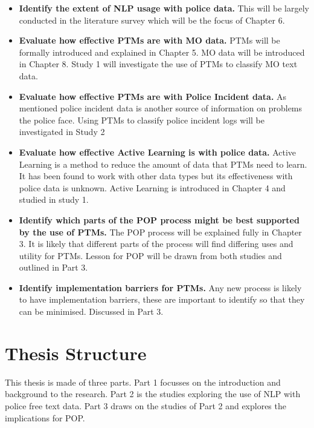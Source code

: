 \begin{itemize}
\item {\bf Identify the extent of NLP usage with police data.} This will be largely conducted in the literature survey which will be the focus of Chapter 6.

\item {\bf Evaluate how effective PTMs are with MO data.} PTMs will be formally introduced and explained in Chapter 5. MO data will be introduced in Chapter 8. Study 1 will investigate the use of PTMs to classify MO text data.

\item {\bf Evaluate how effective PTMs are with Police Incident data.} As mentioned police incident data is another source of information on problems the police face. Using PTMs to classify police incident logs will be investigated in Study 2 

\item {\bf Evaluate how effective Active Learning is with police data.}  Active Learning is a method to reduce the amount of data that PTMs need to learn. It has been found to work with other data types but its effectiveness with police data is unknown. Active Learning is introduced in Chapter 4 and studied in study 1.

\item {\bf Identify which parts of the POP process might be best supported by the use of PTMs.} The POP process will be explained fully in Chapter 3. It is likely that different parts of the process will find differing uses and utility for PTMs. Lesson for POP will be drawn from both studies and outlined in Part 3. 

\item {\bf Identify implementation barriers for PTMs.} Any new process is likely to have implementation barriers, these are important to identify so that they can be minimised. Discussed in Part 3. 

\end{itemize}



\section{Thesis Structure} This thesis is made of three parts. Part 1 focusses on the introduction and background to the research. Part 2 is the studies exploring the use of NLP with police free text data. Part 3 draws on the studies of Part 2 and explores the implications for POP. 


